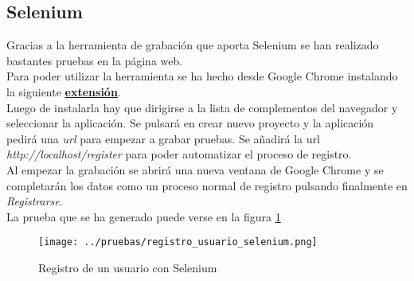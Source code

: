 \subsection{Selenium}
Gracias a la herramienta de grabación que aporta Selenium se han realizado bastantes pruebas en la página web.
\\Para poder utilizar la herramienta se ha hecho desde Google Chrome instalando la siguiente \href{https://chrome.google.com/webstore/detail/selenium-ide/mooikfkahbdckldjjndioackbalphokd}{\textbf{extensión}}.
\\Luego de instalarla hay que dirigirse a la lista de complementos del navegador y seleccionar la aplicación. Se pulsará en crear nuevo proyecto y la aplicación pedirá una \textit{url} para empezar a grabar pruebas. Se añadirá la url \textit{http://localhost/register} para poder automatizar el proceso de registro.
\\Al empezar la grabación se abrirá una nueva ventana de Google Chrome y se completarán los datos como un proceso normal de registro pulsando finalmente en \textit{Registrarse}.
\\La prueba que se ha generado puede verse en la figura \ref{fig:registro-usuario-selenium}
\begin{figure}[h]
    \centering
    \texttt{[image: ../pruebas/registro\_usuario\_selenium.png]}
    \caption{Registro de un usuario con Selenium}\label{fig:registro-usuario-selenium}
\end{figure}
